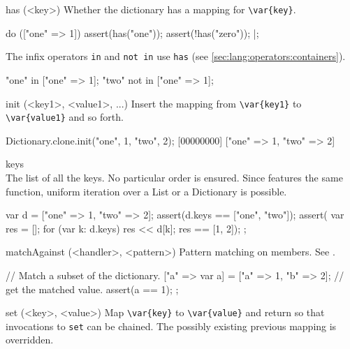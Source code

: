 \begin{urbiscriptapi}
\item[has](<key>)
  Whether the dictionary has a mapping for \lstinline|\var{key}|.

\begin{urbiscript}
do (["one" => 1])
{
  assert(has("one"));
  assert(!has("zero"));
}|;
\end{urbiscript}

  The infix operators \lstinline|in| and \lstinline|not in| use
  \lstinline|has| (see \autoref{sec:lang:operators:containers}).

\begin{urbiassert}
"one" in     ["one" => 1];
"two" not in ["one" => 1];
\end{urbiassert}


\item[init](<key1>, <value1>, ...)%
  Insert the mapping from \lstinline|\var{key1}| to
  \lstinline|\var{value1}| and so forth.

\begin{urbiscript}
Dictionary.clone.init("one", 1, "two", 2);
[00000000] ["one" => 1, "two" => 2]
\end{urbiscript}


\item[keys]\\
  The list of all the keys.  No particular order is ensured.  Since
   features the same function, uniform iteration over
  a List or a Dictionary is possible.
\begin{urbiscript}
{
  var d = ["one" => 1, "two" => 2];
  assert(d.keys == ["one", "two"]);
  assert({
           var res = [];
           for (var k: d.keys)
             res << d[k];
           res
         }
         == [1, 2]);
};
\end{urbiscript}


\item[matchAgainst](<handler>, <pattern>)
  Pattern matching on members.  See .

\begin{urbiscript}
{
  // Match a subset of the dictionary.
  ["a" => var a] = ["a" => 1, "b" => 2];
  // get the matched value.
  assert(a == 1);
};
\end{urbiscript}


\item[set](<key>, <value>)
  Map \lstinline|\var{key}| to \lstinline|\var{value}| and return
  \this so that invocations to \lstinline|set| can be
  chained.  The possibly existing previous mapping is overridden.


\end{urbiscriptapi}
